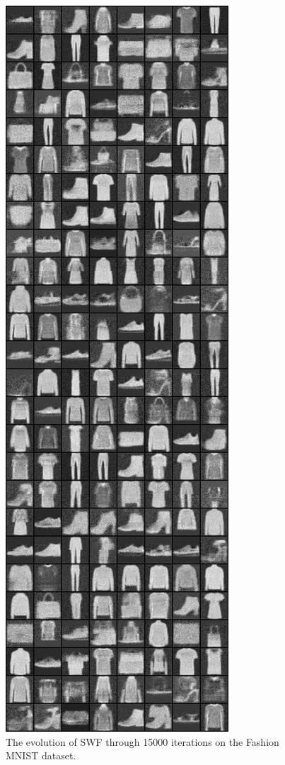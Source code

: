 \begin{figure}
\includegraphics[width=\picwidth\columnwidth]{figures/supplementary/alternative_fmnist/image_15000.png}
\caption{The evolution of SWF through 15000 iterations on the Fashion MNIST dataset.}
\label{fig:suppfmnist}
\end{figure}







